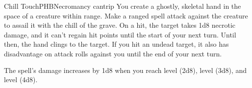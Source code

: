 \begin{spell}{Chill Touch}{PHB}{Necromancy cantrip}
{
}
You create a ghostly, skeletal hand in the space of a
creature within range. Make a ranged spell attack against
the creature to assail it with the chill of the grave. On
a hit, the target takes 1d8 necrotic damage, and it can't
regain hit points until the start of your next turn. Until
then, the hand clings to the target. If you hit an undead
target, it also has disadvantage on attack rolls against
you until the end of your next turn.

 The spell's damage increases by
1d8 when you reach  level (2d8),  level (3d8),
and  level (4d8).
\end{spell}
